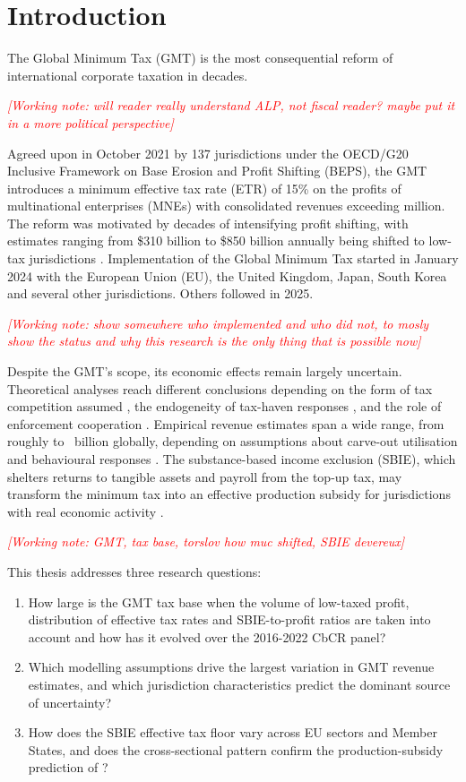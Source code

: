 \documentclass[11pt,a4paper]{article}
\newcommand{\workingnote}[1]{\ifworkingdoc\par\noindent\textcolor{red}{\textit{[Working note: #1]}}\par\fi}
\newcommand{\EUR}{\texteuro}
\begin{document}
\newpage

\section{Introduction}\label{sec:introduction}

The Global Minimum Tax (GMT) is the most consequential reform of international corporate taxation in decades.\workingnote{will reader really understand ALP, not fiscal reader? maybe put it in a more political perspective} Agreed upon in October 2021 by 137 jurisdictions under the OECD/G20 Inclusive Framework on Base Erosion and Profit Shifting (BEPS), the GMT introduces a minimum effective tax rate (ETR) of 15\% on the profits of multinational enterprises (MNEs) with consolidated revenues exceeding \EUR 750 million. The reform was motivated by decades of intensifying profit shifting, with estimates ranging from \$310 billion to \$850 billion annually being shifted to low-tax jurisdictions \citep{torslov2023, garcia-bernardo2024, blouin2023}. Implementation of the Global Minimum Tax started in January 2024 with the European Union (EU), the United Kingdom, Japan, South Korea and several other jurisdictions. Others followed in 2025.\workingnote{show somewhere who implemented and who did not, to mosly show the status and why this research is the only thing that is possible now}

Despite the GMT's scope, its economic effects remain largely uncertain. Theoretical analyses reach different conclusions depending on the form of tax competition assumed \parencite{janeba2023}, the endogeneity of tax-haven responses \parencite{johannesen2022}, and the role of enforcement cooperation \parencite{jean2026}. Empirical revenue estimates span a wide range, from roughly \EUR100 to \EUR180~billion globally, depending on assumptions about carve-out utilisation and behavioural responses \parencite{barake2022}. The substance-based income exclusion (SBIE), which shelters returns to tangible assets and payroll from the top-up tax, may transform the minimum tax into an effective production subsidy for jurisdictions with real economic activity \parencite{schjelderup2024}.

\workingnote{GMT, tax base, torslov how muc shifted, SBIE devereux}

This thesis addresses three research questions:

\begin{enumerate}
\item How large is the GMT tax base when the volume of low-taxed profit, distribution of effective tax rates and SBIE-to-profit ratios are taken into account and how has it evolved over the 2016-2022 CbCR panel?
\item Which modelling assumptions drive the largest variation in GMT revenue estimates, and which jurisdiction characteristics predict the dominant source of uncertainty?
\item How does the SBIE effective tax floor vary across EU sectors and Member States, and does the cross-sectional pattern confirm the production-subsidy prediction of \citet{schjelderup2024}?
\end{enumerate}
\end{document}
